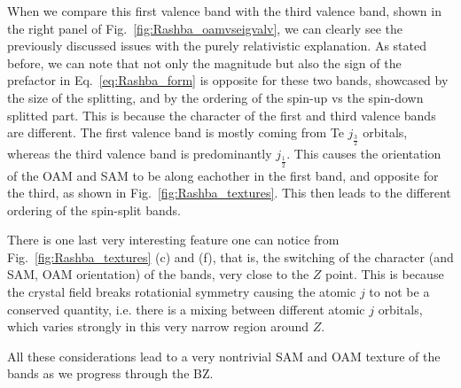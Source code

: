 When we compare this first valence band with the third valence band, shown in the right panel of Fig.~\ref{fig:Rashba_oamvseigvalv}, we can clearly see the previously discussed issues with the purely relativistic explanation. As stated before, we can note that not only the magnitude but also the sign of the prefactor in Eq.~\ref{eq:Rashba_form} is opposite for these two bands, showcased by the size of the splitting, and by the ordering of the spin-up vs the spin-down splitted part. This is because the character of the first and third valence bands are different. The first valence band is mostly coming from Te $j_{\frac{3}{2}}$ orbitals, whereas the third valence band is predominantly $j_{\frac{1}{2}}$. This causes the orientation of the OAM and SAM to be along eachother in the first band, and opposite for the third, as shown in Fig.~\ref{fig:Rashba_textures}. This then leads to the different ordering of the spin-split bands.

There is one last very interesting feature one can notice from Fig.~\ref{fig:Rashba_textures} (c) and (f), that is, the switching of the character (and SAM, OAM orientation) of the bands, very close to the $Z$ point. This is because the crystal field breaks rotationial symmetry causing the atomic $j$ to not be a conserved quantity, i.e. there is a mixing between different atomic $j$ orbitals, which varies strongly in this very narrow region around $Z$.

All these considerations lead to a very nontrivial SAM and OAM texture of the bands as we progress through the BZ.

\begin{figure*}[h]
\centering
{}
\caption{\label{fig:Rashba_oamvseigvalv}Comparison between the real-space observables and energy dispersion in (a) the first and (b) third valence band. The values are plotted in function of the relative distance from the $Z$ point $\bm{k}_r = \bm{k} - \bm{k}_Z$, towards the A and U points. The green graphs denote the values before turning on atomic SOC, whereas the orange and blue graphs denote the two spin-split bands.}
\end{figure*}

